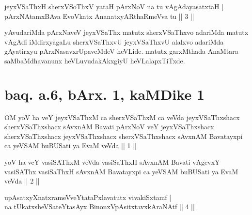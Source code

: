 \begin{shl}
\footnotemark[2]jeyxVSaThxH sherxVSoThxV yataH pArxNoV na tu vAgAdayasatxtaH | \\
pArxNAtamxBAva EvoVkatx AnanatxyARthaRmeVva tu \hfill|| 3 || 
\end{shl}

\begin{artha} 
yAvudariMda pArxNaveV jeyxVSaThx matutx sherxVSaThxvo adariMda matutx 
vAgAdi \-iMdirxyagaLu sherxVSaThxvU jeyxVSaThxvU alalxvo adariMda 
gAyatirxyu pArxNasavxrUpa\-veMdeV heVLide. matutx garxMthada AnaMtara 
saMbaMdhavanunx heVLuvudakAkxgiyU heVLalapxTiTxde.
\end{artha}

\section*{baq. a.6, bArx. 1, kaMDike 1}

\begin{shl}
OM yoV ha veY jeyxVSaThxM ca sherxVSaThxM ca veVda jeyxVSaThxshacx sherxVSaThxshacx sAvxnAM Bavati pArxNoV veY jeyxVSaThxshacx sherxVSaThxshacx jeyxVSaThxshacx sherxVSaThxshacx sAvxnAM Bavatayxpi ca yeVSAM buBUSati ya EvaM veVda || 1 ||
\end{shl}

\begin{shl}
yoV ha veY vasiSAThxM veVda vasiSaThxH sAvxnAM Bavati vAgevxY vasiSAThx vasiSaThxH sAvxnAM Bavatayxpi ca yeVSAM buBUSati ya EvaM veVda || 2 ||
\end{shl}

\begin{shl}
upAsatxyXnatxrameVveYtataPxlavatutx vivakiSxtamf | \\
na tUkatxsheVSateYtasAyx BinonxVpAsitxtavxkAraNAtf \hfill|| 4 || 
\end{shl}

